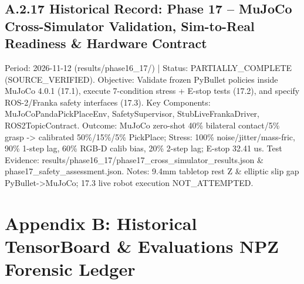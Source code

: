 \documentclass[11pt,a4paper,oneside]{book}
\begin{document}
\section{A.2.17 Historical Record: Phase 17 -- MuJoCo Cross-Simulator Validation, Sim-to-Real Readiness \& Hardware Contract}
Period: 2026-11-12 (results/phase16\_17/) | Status: PARTIALLY\_COMPLETE (SOURCE\_VERIFIED). Objective: Validate frozen PyBullet policies inside MuJoCo 4.0.1 (17.1), execute 7-condition stress + E-stop tests (17.2), and specify ROS-2/Franka safety interfaces (17.3). Key Components: MuJoCoPandaPickPlaceEnv, SafetySupervisor, StubLiveFrankaDriver, ROS2TopicContract. Outcome: MuJoCo zero-shot 40\% bilateral contact/5\% grasp -> calibrated 50\%/15\%/5\% PickPlace; Stress: 100\% noise/jitter/mass-fric, 90\% 1-step lag, 60\% RGB-D calib bias, 20\% 2-step lag; E-stop 32.41 us. Test Evidence: results/phase16\_17/phase17\_cross\_simulator\_results.json \& phase17\_safety\_assessment.json. Notes: 9.4mm tabletop rest Z \& elliptic slip gap PyBullet->MuJoCo; 17.3 live robot execution NOT\_ATTEMPTED.

\chapter{Appendix B: Historical TensorBoard \& Evaluations NPZ Forensic Ledger}
\end{document}
